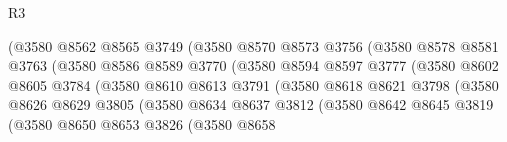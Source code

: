 \begin{lexlean}{R3}
\begin{coremodule}
                                  (@3580
                                    @8562
                                    @8565
                                    @3749
                                    (@3580
                                      @8570
                                      @8573
                                      @3756
                                      (@3580
                                        @8578
                                        @8581
                                        @3763
                                        (@3580
                                          @8586
                                          @8589
                                          @3770
                                          (@3580
                                            @8594
                                            @8597
                                            @3777
                                            (@3580
                                              @8602
                                              @8605
                                              @3784
                                              (@3580
                                                @8610
                                                @8613
                                                @3791
                                                (@3580
                                                  @8618
                                                  @8621
                                                  @3798
                                                  (@3580
                                                    @8626
                                                    @8629
                                                    @3805
                                                    (@3580
                                                      @8634
                                                      @8637
                                                      @3812
                                                      (@3580
                                                        @8642
                                                        @8645
                                                        @3819
                                                        (@3580
                                                          @8650
                                                          @8653
                                                          @3826
                                                          (@3580
                                                            @8658

\end{coremodule}
\end{lexlean}
